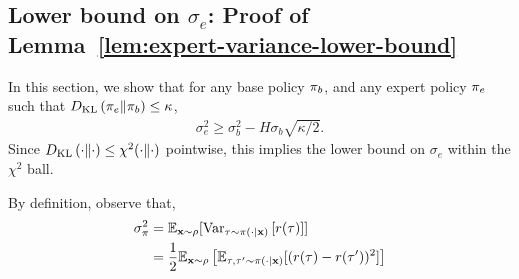 \subsection{Lower bound on \texorpdfstring{$\sigma_e$}{}: Proof of Lemma~\ref{lem:expert-variance-lower-bound}}
\label{subsec:proof-expert-variance-lower-bound}

In this section, we show that for any base policy $\pi_b$, and any expert policy $\pi_e$ such that $D_{\mathrm{KL}} \left( \pi_e \| \pi_b \right) \le \kappa$,
\begin{align*}
    \sigma_e^2 \ge \sigma_b^2 - H \sigma_b \sqrt{\kappa/2}.
\end{align*}
Since $D_{\mathrm{KL}} \left( \cdot \| \cdot \right) \le \chi^2 (\cdot \| \cdot )$ pointwise, this implies the lower bound on $\sigma_e$ within the $\chi^2$ ball.

By definition, observe that,
\begin{align*}
    \sigma_\pi^2 &= \mathbb{E}_{\mathbf{x} \sim \rho} [\mathrm{Var}_{\tau \sim \pi(\cdot \mid \mathbf{x})} \left [ r(\tau) \right ]] \\
    &= \frac{1}{2} \mathbb{E}_{\mathbf{x} \sim \rho} \left[ \mathbb{E}_{\tau, \tau' \sim \pi (\cdot \mid \mathbf{x})} [ ( r(\tau)-r(\tau'))^2 ] \right]
\end{align*}


